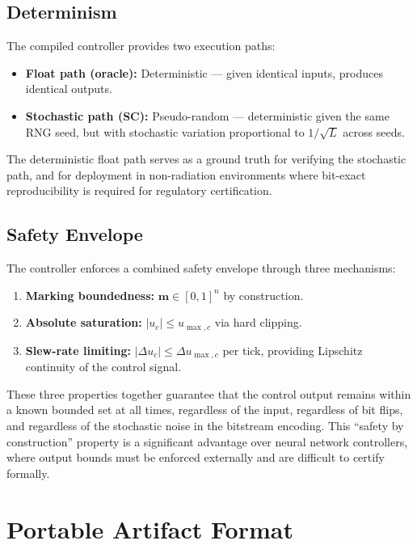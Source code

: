 \documentclass[12pt]{article}
\begin{document}
\subsection{Determinism}

The compiled controller provides two execution paths:
\begin{itemize}
  \item \textbf{Float path (oracle):} Deterministic --- given identical
    inputs, produces identical outputs.
  \item \textbf{Stochastic path (SC):} Pseudo-random --- deterministic
    given the same RNG seed, but with stochastic variation proportional
    to $1/\sqrt{L}$ across seeds.
\end{itemize}

The deterministic float path serves as a ground truth for verifying the
stochastic path, and for deployment in non-radiation environments where
bit-exact reproducibility is required for regulatory certification.

\subsection{Safety Envelope}

The controller enforces a combined safety envelope through three
mechanisms:
\begin{enumerate}
  \item \textbf{Marking boundedness:} $\mathbf{m} \in [0,1]^n$ by
    construction.
  \item \textbf{Absolute saturation:} $|u_c| \le u_{\max,c}$ via
    hard clipping.
  \item \textbf{Slew-rate limiting:} $|\Delta u_c| \le \Delta u_{\max,c}$
    per tick, providing Lipschitz continuity of the control signal.
\end{enumerate}

These three properties together guarantee that the control output
remains within a known bounded set at all times, regardless of the
input, regardless of bit flips, and regardless of the stochastic
noise in the bitstream encoding.  This ``safety by construction''
property is a significant advantage over neural network controllers,
where output bounds must be enforced externally and are difficult to
certify formally.


\section{Portable Artifact Format}
\label{sec:artifact}
\end{document}
